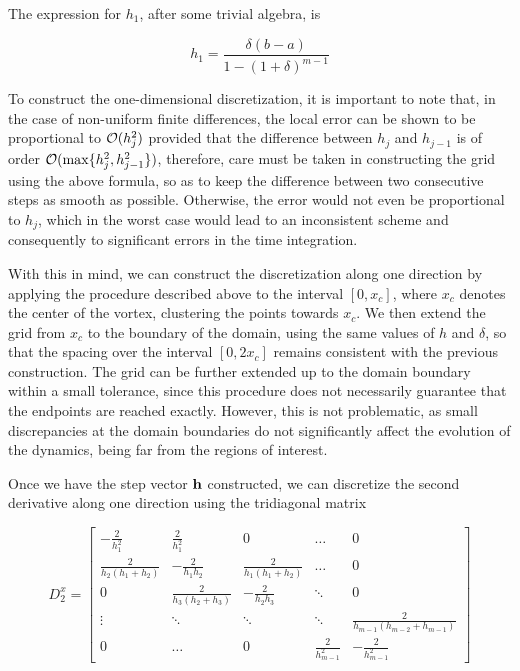 The expression for $h_1$, after some trivial algebra, is

\[ h_1 = \frac{\delta(b - a)}{1 - (1 + \delta)^{m - 1}} \]

To construct the one-dimensional discretization, it is important to note that, in the case of non-uniform finite differences, the local error can be shown to be proportional to $\mathcal{O}(h_j^2)$ provided that the difference between $h_j$ and $h_{j-1}$ is of order $\mathcal{O}(\max\{h_j^2, h_{j-1}^2\})$, therefore, care must be taken in constructing the grid using the above formula, so as to keep the difference between two consecutive steps as smooth as possible. Otherwise, the error would not even be proportional to $h_j$, which in the worst case would lead to an inconsistent scheme and consequently to significant errors in the time integration.

With this in mind, we can construct the discretization along one direction by applying the procedure described above to the interval $[0, x_c]$, where $x_c$ denotes the center of the vortex, clustering the points towards $x_c$.  
We then extend the grid from $x_c$ to the boundary of the domain, using the same values of $h$ and $\delta$, so that the spacing over the interval $[0, 2x_c]$ remains consistent with the previous construction.  
The grid can be further extended up to the domain boundary within a small tolerance, since this procedure does not necessarily guarantee that the endpoints are reached exactly.  
However, this is not problematic, as small discrepancies at the domain boundaries do not significantly affect the evolution of the dynamics, being far from the regions of interest.

Once we have the step vector $\mathbf{h}$ constructed, we can discretize the second derivative along one direction using the tridiagonal matrix

\[
    D_2^x =
    \begin{bmatrix}
        -\frac{2}{h_1^2} & \frac{2}{h_1^2} & 0 & \dots & 0 \\
        \frac{2}{h_2(h_1+h_2)} & -\frac{2}{h_1 h_2} & \frac{2}{h_1(h_1+h_2)} & \dots & 0 \\
        0 & \frac{2}{h_3(h_2+h_3)} & -\frac{2}{h_2 h_3} & \ddots & 0 \\
        \vdots & \ddots & \ddots & \ddots & \frac{2}{h_{m-1}(h_{m-2}+h_{m-1})} \\
        0 & \dots & 0 & \frac{2}{h_{m-1}^2} & -\frac{2}{h_{m-1}^2}
    \end{bmatrix}
\]

